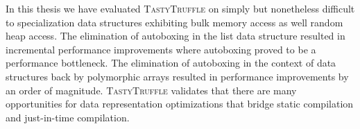 In this thesis we have evaluated \textsc{TastyTruffle} on simply but nonetheless difficult to specialization data structures exhibiting bulk memory access as well random heap access.
The elimination of autoboxing in the list data structure resulted in incremental performance improvements where autoboxing proved to be a performance bottleneck.
The elimination of autoboxing in the context of data structures back by polymorphic arrays resulted in performance improvements by an order of magnitude.
\textsc{TastyTruffle} validates that there are many opportunities for data representation optimizations that bridge static compilation and just-in-time compilation.

